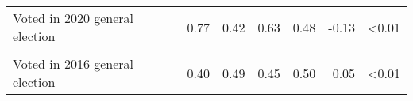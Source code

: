 \begin{table}
{\begin{tabular}[t]{lrrrrrr}
Voted in 2020 general election & 0.77 & 0.42 & 0.63 & 0.48 & -0.13 & <0.01\\
\cellcolor[HTML]{D3D3D3}{Voted in 2017 municipal election} & \cellcolor[HTML]{D3D3D3}{0.09} & \cellcolor[HTML]{D3D3D3}{0.29} & \cellcolor[HTML]{D3D3D3}{0.11} & \cellcolor[HTML]{D3D3D3}{0.31} & \cellcolor[HTML]{D3D3D3}{0.02} & \cellcolor[HTML]{D3D3D3}{<0.01}\\
Voted in 2016 general election & 0.40 & 0.49 & 0.45 & 0.50 & 0.05 & <0.01\\
\bottomrule
\end{tabular}}
\end{table}
